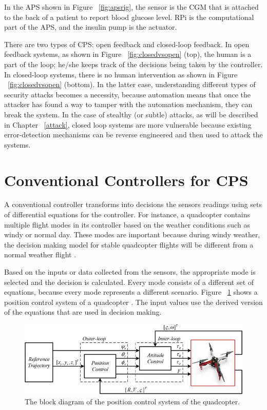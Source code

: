 In the \ac{APS} shown in Figure ~\ref{fig:apsrig}, the sensor is the \ac{CGM} that is attached to the back of a patient to report blood glucose level.  
\ac{RPi} is the computational part of the \ac{APS}, and the insulin pump is the actuator. 

There are two types of CPS: open feedback and closed-loop feedback.
In open feedback systems, 
as shown in Figure ~\ref{fig:closedvsopen} (top), the human is a part of the loop; he/she keeps track of the decisions being taken by the controller. 
In closed-loop systems, there is no human intervention 
as shown in Figure ~\ref{fig:closedvsopen} (bottom). 
In the latter case, understanding different types of security attacks becomes a necessity, because automation means that once the attacker has found a way to tamper with the automation mechanism, they can break the system. 
In the case of stealthy (or subtle) attacks, as will be described in Chapter ~\ref{attack}, 
closed loop systems are more vulnerable because existing error-detection mechanisms can be reverse engineered and then used to attack the systems. 

\section{Conventional Controllers for CPS}

A conventional controller transforms into decisions the sensors readings using sets of differential equations for the controller. 
For instance, a quadcopter contains multiple flight modes in its controller based on the weather conditions such as windy or normal day. 
These modes are important because during windy weather, the decision making model for stable quadcopter flights will be different from a normal weather flight \cite{inbook}. 

Based on the inputs or data collected from the sensors, the appropriate  mode is selected and the decision is calculated. 
Every mode consists of a different set of equations, because every mode represents a different scenario.
Figure ~\ref{fig:controltheory} shows a position control system of a quadcopter \cite{inbook}. The input values use the derived version of the equations that are used in decision making. 

\begin{figure}
	\centering
	\includegraphics[width=0.7\linewidth]{Images/controltheory}
	\caption{The block diagram of the position control system of the quadcopter.
	}
	\label{fig:controltheory} 
\end{figure}


